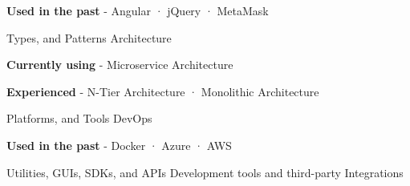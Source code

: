 \begin{cventries}
{\begin{cvitems}
        \item {\textbf{Used in the past} \hspace{0.03cm} - \hspace{0.03cm} Angular \hspace{0.03cm} · \hspace{0.03cm} jQuery \hspace{0.03cm} · \hspace{0.03cm} MetaMask \\} %
      \end{cvitems}
    }
  \cventry
    {Types, and Patterns} %
    {Architecture} %
    {} %
    {} %
    {
      \begin{cvitems} %
        \item {\textbf{Currently using} \hspace{0.03cm} - \hspace{0.03cm} Microservice Architecture} %
        \item {\textbf{Experienced} \hspace{0.03cm} - \hspace{0.03cm} N-Tier Architecture \hspace{0.03cm} · \hspace{0.03cm} Monolithic Architecture \\} %
      \end{cvitems}
    }
  \cventry
    {Platforms, and Tools} %
    {DevOps} %
    {} %
    {} %
    {
      \begin{cvitems} %
        \item {\textbf{Used in the past} \hspace{0.03cm} - \hspace{0.03cm} Docker \hspace{0.03cm} · \hspace{0.03cm} Azure \hspace{0.03cm} · \hspace{0.03cm} AWS \\} %
      \end{cvitems}
    }
  \cventry
    {Utilities, GUIs, SDKs, and APIs} %
    {Development tools and third-party Integrations} %
    {} %

\end{cventries}
